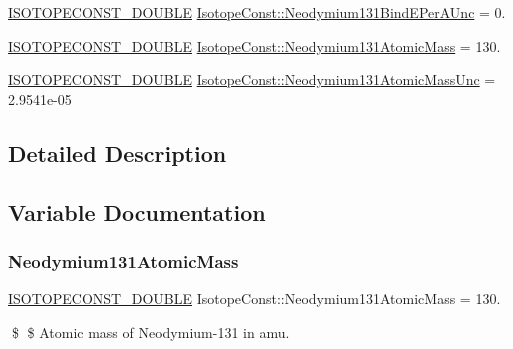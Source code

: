 \begin{DoxyCompactItemize}
\mbox{\hyperlink{group___isotope_const-_macros_ga8f45a7272ce02c0b4c65c44636ed719a}{I\+S\+O\+T\+O\+P\+E\+C\+O\+N\+S\+T\+\_\+\+D\+O\+U\+B\+LE}} \mbox{\hyperlink{group___isotope_const-_neodymium-_nd131_ga96ed6aef238d0b45189bb2d772868af1}{Isotope\+Const\+::\+Neodymium131\+Bind\+E\+Per\+A\+Unc}} = 0.
\item 
\mbox{\hyperlink{group___isotope_const-_macros_ga8f45a7272ce02c0b4c65c44636ed719a}{I\+S\+O\+T\+O\+P\+E\+C\+O\+N\+S\+T\+\_\+\+D\+O\+U\+B\+LE}} \mbox{\hyperlink{group___isotope_const-_neodymium-_nd131_ga6a68203fb619647bde37a57d7a102dc7}{Isotope\+Const\+::\+Neodymium131\+Atomic\+Mass}} = 130.
\item 
\mbox{\hyperlink{group___isotope_const-_macros_ga8f45a7272ce02c0b4c65c44636ed719a}{I\+S\+O\+T\+O\+P\+E\+C\+O\+N\+S\+T\+\_\+\+D\+O\+U\+B\+LE}} \mbox{\hyperlink{group___isotope_const-_neodymium-_nd131_gac4851a13b2aca08ff0b02d6b3af6d523}{Isotope\+Const\+::\+Neodymium131\+Atomic\+Mass\+Unc}} = 2.\+9541e-\/05
\end{DoxyCompactItemize}


\subsection{Detailed Description}


\subsection{Variable Documentation}
\mbox{\label{group___isotope_const-_neodymium-_nd131_ga6a68203fb619647bde37a57d7a102dc7}} 
\subsubsection{\texorpdfstring{Neodymium131\+Atomic\+Mass}{Neodymium131AtomicMass}}
{\footnotesize\ttfamily \mbox{\hyperlink{group___isotope_const-_macros_ga8f45a7272ce02c0b4c65c44636ed719a}{I\+S\+O\+T\+O\+P\+E\+C\+O\+N\+S\+T\+\_\+\+D\+O\+U\+B\+LE}} Isotope\+Const\+::\+Neodymium131\+Atomic\+Mass = 130.}

\$ \$ Atomic mass of Neodymium-\/131 in amu. \mbox{\label{group___isotope_const-_neodymium-_nd131_gac4851a13b2aca08ff0b02d6b3af6d523}} 
